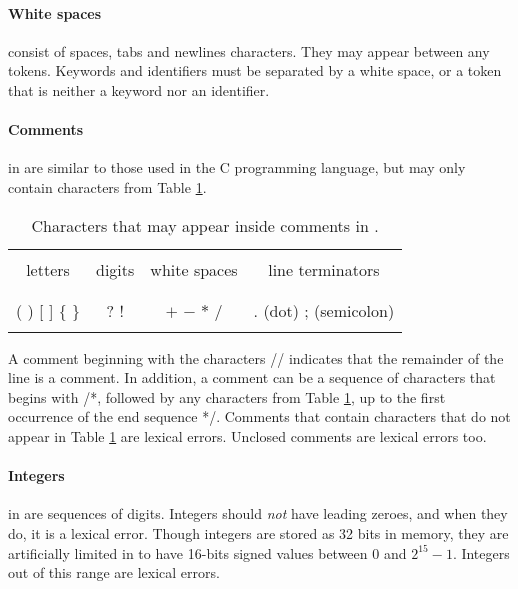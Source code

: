 \documentclass{article}
\begin{document}
\paragraph{White spaces} consist of spaces, tabs and newlines characters.
They may appear between any tokens.
Keywords and identifiers must be separated by a white space,
or a token that is neither a keyword nor an identifier.
\paragraph{Comments} in \plname are similar to those used in the C programming language,
but may only contain characters from Table \ref{Table_Characters_That _May_Appear_inside_Comments}.
\begin{table}[h]
\centering
\begin{tabular}{ | c | c | c | c | }
\hline
        &        &              &                  \\
letters & digits & white spaces & line terminators \\
        &        &              &                  \\
\hline
                  &     &                 &                       \\
( ) [ ] $\{$ $\}$ & ? ! & $+$ $-$ $*$ $/$ & . (dot) ; (semicolon) \\
                  &     &                 &                       \\
\hline
\end{tabular}
\caption{
Characters that may appear inside comments in \plname.
\label{Table_Characters_That _May_Appear_inside_Comments}}
\end{table}
A comment beginning with the characters // indicates that the remainder of the line is a comment.
In addition, a comment can be a sequence of characters that begins with /*,
followed by any characters from Table \ref{Table_Characters_That _May_Appear_inside_Comments},
up to the first occurrence of the end sequence */.
Comments that contain characters that do not appear in Table
\ref{Table_Characters_That _May_Appear_inside_Comments} are lexical errors.
Unclosed comments are lexical errors too.
\paragraph{Integers} in \plname are sequences of digits.
Integers should \textit{not} have leading zeroes,
and when they do, it is a lexical error.
Though integers are stored as 32 bits in memory,
they are artificially limited in \plname to have
16-bits signed values between $0$ and $2^{15}-1$.
Integers out of this range are lexical errors.
\end{document}
